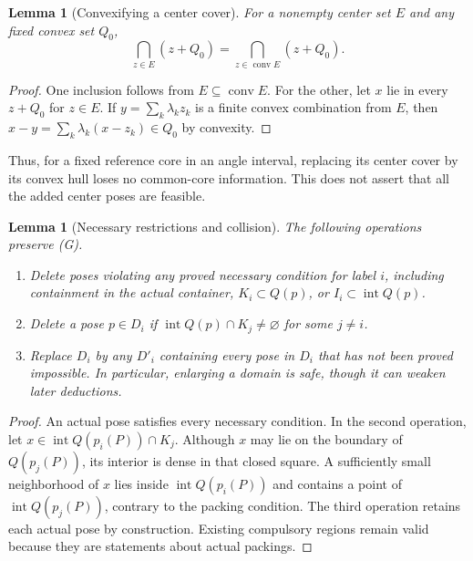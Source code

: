 \documentclass[11pt]{article}
\newtheorem{lemma}[theorem]{Lemma}
\begin{document}
\begin{lemma}[Convexifying a center cover]\label{lem:convex-center-cover}
For a nonempty center set $E$ and any fixed convex set $Q_0$,
\[
 \bigcap_{z\in E}(z+Q_0)
 =\bigcap_{z\in\operatorname{conv}E}(z+Q_0).
\]
\end{lemma}
\begin{proof}
One inclusion follows from $E\subseteq\operatorname{conv}E$.
For the other, let $x$ lie in every $z+Q_0$ for $z\in E$.
If $y=\sum_k\lambda_k z_k$ is a finite convex combination from $E$, then
$x-y=\sum_k\lambda_k(x-z_k)\in Q_0$ by convexity.
\end{proof}
Thus, for a fixed reference core in an angle interval, replacing its
center cover by its convex hull loses no common-core information.
This does not assert that all the added center poses are feasible.

\begin{lemma}[Necessary restrictions and collision]\label{lem:pose-restrictions}
The following operations preserve (G).
\begin{enumerate}
 \item Delete poses violating any proved necessary condition for label $i$,
 including containment in the actual container,
 $K_i\subset Q(p)$, or $I_i\subset\operatorname{int}Q(p)$.
 \item Delete a pose $p\in D_i$ if
 $\operatorname{int}Q(p)\cap K_j\ne\varnothing$ for some $j\ne i$.
 \item Replace $D_i$ by any $D'_i$ containing every pose in $D_i$ that has
 not been proved impossible.  In particular, enlarging a domain is safe,
 though it can weaken later deductions.
\end{enumerate}
\end{lemma}

\begin{proof}
An actual pose satisfies every necessary condition.  In the second
operation, let $x\in\operatorname{int}Q(p_i(P))\cap K_j$.  Although $x$
may lie on the boundary of $Q(p_j(P))$, its interior is dense in that closed
square.  A sufficiently small neighborhood of $x$ lies inside
$\operatorname{int}Q(p_i(P))$ and contains a point of
$\operatorname{int}Q(p_j(P))$, contrary to the packing condition.
The third operation
retains each actual pose by construction.  Existing compulsory regions
remain valid because they are statements about actual packings.
\end{proof}
\end{document}
